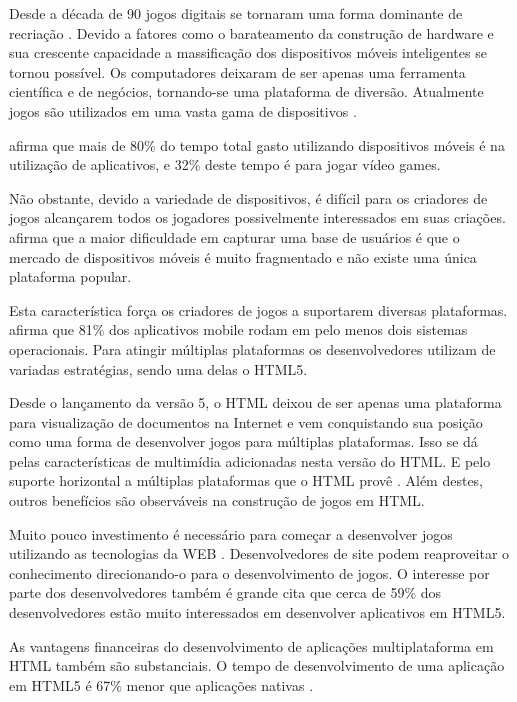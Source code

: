 
Desde a década de 90 jogos digitais se tornaram uma forma dominante
de recriação \autocite{gameDesignPatterns}. Devido a fatores como o
barateamento da construção de hardware e sua crescente capacidade a massificação
dos dispositivos móveis inteligentes se tornou possível. Os
computadores deixaram de ser apenas uma ferramenta científica e de
negócios, tornando-se uma plataforma de diversão. Atualmente jogos
são utilizados em uma vasta gama de dispositivos \autocite[pp.
6]{crossPlatformMobileGameDevelopment}.

\autocite{HTML5CrossPlatformGameDevelopment} afirma que mais de 80\% do
tempo total gasto utilizando dispositivos móveis é na utilização de
aplicativos, e 32\% deste tempo é para jogar vídeo games.

Não obstante, devido a variedade de dispositivos, é difícil para
os criadores de jogos alcançarem todos os jogadores possivelmente
interessados em suas criações. \citet{html5Tradeoffs} afirma que a
maior dificuldade em capturar uma base de usuários é que o mercado
de dispositivos móveis é muito fragmentado e não existe uma única
plataforma popular.

Esta característica força os criadores de jogos a suportarem diversas
plataformas. \autocite{htmlSurvey} afirma que 81\% dos aplicativos
mobile rodam em pelo menos dois sistemas operacionais. Para atingir
múltiplas plataformas os desenvolvedores utilizam de variadas
estratégias, sendo uma delas o HTML5.

Desde o lançamento da versão 5, o HTML deixou de ser apenas uma
plataforma para visualização de documentos na Internet e vem
conquistando sua posição como uma forma de desenvolver jogos
para múltiplas plataformas. Isso se dá pelas características de
multimídia adicionadas nesta versão do HTML. E pelo suporte horizontal
a múltiplas plataformas que o HTML provê \autocite{html5Tradeoffs}.
Além destes, outros benefícios são observáveis na construção de
jogos em HTML.

Muito pouco investimento é necessário para começar a desenvolver
jogos utilizando as tecnologias da WEB \autocite{html5mostwanted}.
Desenvolvedores de site podem reaproveitar o conhecimento direcionando-o
para o desenvolvimento de jogos. O interesse por parte dos
desenvolvedores também é grande \autocite{htmlSurvey} cita que cerca
de 59\% dos desenvolvedores estão muito interessados em desenvolver
aplicativos em HTML5.

As vantagens financeiras do desenvolvimento de aplicações
multiplataforma em HTML também são substanciais. O tempo de
desenvolvimento de uma aplicação em HTML5 é 67\% menor que
aplicações nativas \autocite[p. 460]{html5Tradeoffs}.


